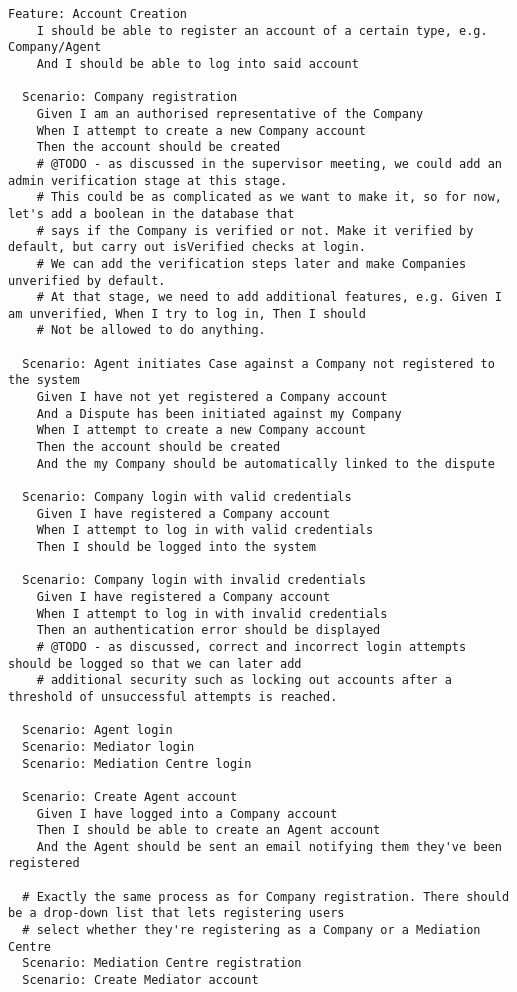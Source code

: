 \begin{lstlisting}
Feature: Account Creation
    I should be able to register an account of a certain type, e.g. Company/Agent
    And I should be able to log into said account

  Scenario: Company registration
    Given I am an authorised representative of the Company
    When I attempt to create a new Company account
    Then the account should be created
    # @TODO - as discussed in the supervisor meeting, we could add an admin verification stage at this stage.
    # This could be as complicated as we want to make it, so for now, let's add a boolean in the database that
    # says if the Company is verified or not. Make it verified by default, but carry out isVerified checks at login.
    # We can add the verification steps later and make Companies unverified by default.
    # At that stage, we need to add additional features, e.g. Given I am unverified, When I try to log in, Then I should
    # Not be allowed to do anything.

  Scenario: Agent initiates Case against a Company not registered to the system
    Given I have not yet registered a Company account
    And a Dispute has been initiated against my Company
    When I attempt to create a new Company account
    Then the account should be created
    And the my Company should be automatically linked to the dispute

  Scenario: Company login with valid credentials
    Given I have registered a Company account
    When I attempt to log in with valid credentials
    Then I should be logged into the system

  Scenario: Company login with invalid credentials
    Given I have registered a Company account
    When I attempt to log in with invalid credentials
    Then an authentication error should be displayed
    # @TODO - as discussed, correct and incorrect login attempts should be logged so that we can later add
    # additional security such as locking out accounts after a threshold of unsuccessful attempts is reached.

  Scenario: Agent login
  Scenario: Mediator login
  Scenario: Mediation Centre login

  Scenario: Create Agent account
    Given I have logged into a Company account
    Then I should be able to create an Agent account
    And the Agent should be sent an email notifying them they've been registered

  # Exactly the same process as for Company registration. There should be a drop-down list that lets registering users
  # select whether they're registering as a Company or a Mediation Centre
  Scenario: Mediation Centre registration
  Scenario: Create Mediator account
\end{lstlisting}


